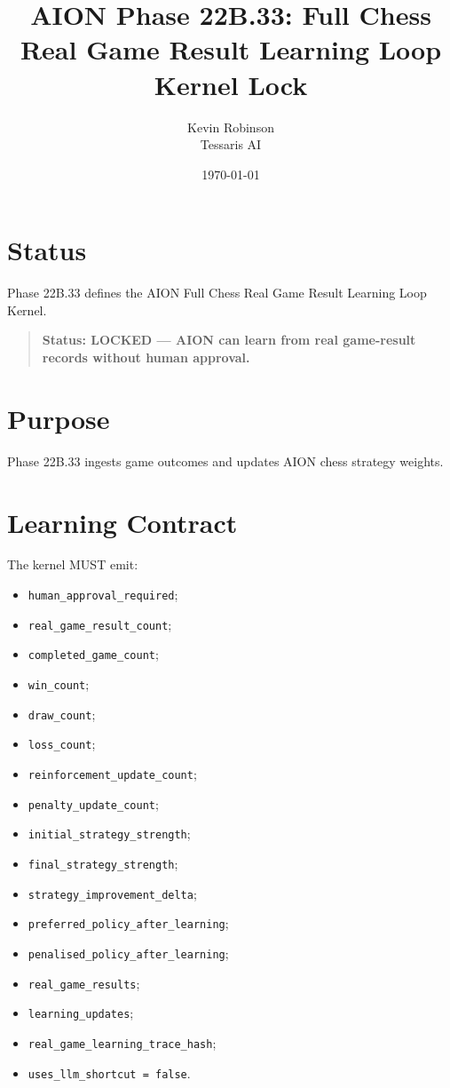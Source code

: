 \documentclass[11pt,a4paper]{article}
\title{\textbf{AION Phase 22B.33: Full Chess Real Game Result Learning Loop Kernel Lock}}
\author{Kevin Robinson\\Tessaris AI}
\date{\today}
\begin{document}
\maketitle

\section{Status}

Phase 22B.33 defines the AION Full Chess Real Game Result Learning Loop Kernel.

\begin{quote}
\textbf{Status: LOCKED --- AION can learn from real game-result records without human approval.}
\end{quote}

\section{Purpose}

Phase 22B.33 ingests game outcomes and updates AION chess strategy weights.

\section{Learning Contract}

The kernel MUST emit:

\begin{itemize}
  \item \texttt{human\_approval\_required};
  \item \texttt{real\_game\_result\_count};
  \item \texttt{completed\_game\_count};
  \item \texttt{win\_count};
  \item \texttt{draw\_count};
  \item \texttt{loss\_count};
  \item \texttt{reinforcement\_update\_count};
  \item \texttt{penalty\_update\_count};
  \item \texttt{initial\_strategy\_strength};
  \item \texttt{final\_strategy\_strength};
  \item \texttt{strategy\_improvement\_delta};
  \item \texttt{preferred\_policy\_after\_learning};
  \item \texttt{penalised\_policy\_after\_learning};
  \item \texttt{real\_game\_results};
  \item \texttt{learning\_updates};
  \item \texttt{real\_game\_learning\_trace\_hash};
  \item \texttt{uses\_llm\_shortcut = false}.
\end{itemize}
\end{document}
